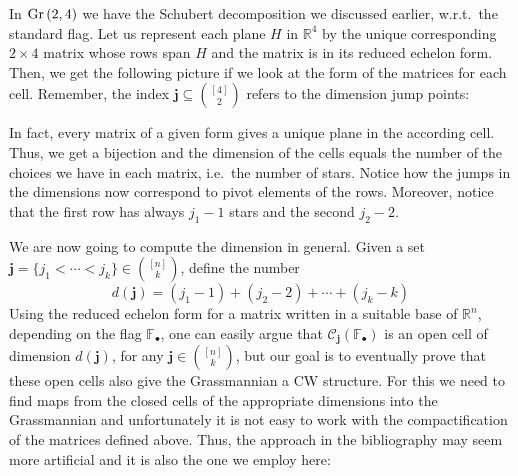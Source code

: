 \begin{example} In $\Gr{2}{4}$ we have the Schubert decomposition we discussed earlier, w.r.t.\ the standard flag. Let us represent each plane $H$ in $\mathbb{R}^4$ by the unique corresponding $2\times 4$ matrix whose rows span $H$ and the matrix is in its reduced echelon form. Then, we get the following picture if we look at the form of the matrices for each cell. Remember, the index $\mathbf{j}\subseteq\binom{[4]}{2}$ refers to the dimension jump points:
\begin{center}
\end{center}
In fact, every matrix of a given form gives a unique plane in the according cell. Thus, we get a bijection and the dimension of the cells equals the number of the choices we have in each matrix, i.e.\ the number of stars. Notice how the jumps in the dimensions now correspond to pivot elements of the rows. Moreover, notice that the first row has always $j_1-1$ stars and the second $j_2-2$.
\end{example}

We are now going to compute the dimension in general. Given a set $\mathbf{j}=\{j_1<\cdots<j_k\}\in\binom{[n]}{k}$, define the number
\[d(\mathbf{j})=(j_1-1)+(j_2-2)+\cdots+(j_k-k)\]
Using the reduced echelon form for a matrix written in a suitable base of $\mathbb{R}^n$, depending on the flag $\mathbb{F}_{\bullet}$, one can easily argue that $\mathcal{C}_{\mathbf{j}}\left(\mathbb{F}_{\bullet}\right)$ is an open cell of dimension $d(\mathbf{j})$, for any $\mathbf{j}\in\binom{[n]}{k}$, but our goal is to eventually prove that these open cells also give the Grassmannian a CW structure. For this we need to find maps from the closed cells of the appropriate dimensions into the Grassmannian and unfortunately it is not easy to work with the compactification of the matrices defined above. Thus, the approach in the bibliography may seem more artificial and it is also the one we employ here:

